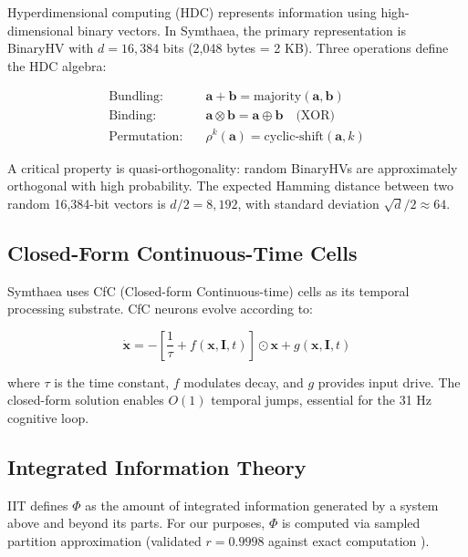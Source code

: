 \documentclass[11pt,a4paper]{article}
\begin{document}
Hyperdimensional computing (HDC) \citep{kanerva2009} represents information using high-dimensional binary vectors. In Symthaea, the primary representation is BinaryHV with $d = 16{,}384$ bits (2,048 bytes = 2 KB). Three operations define the HDC algebra:

\begin{align}
\text{Bundling:} \quad & \mathbf{a} + \mathbf{b} = \text{majority}(\mathbf{a}, \mathbf{b}) \\
\text{Binding:} \quad & \mathbf{a} \otimes \mathbf{b} = \mathbf{a} \oplus \mathbf{b} \quad \text{(XOR)} \\
\text{Permutation:} \quad & \rho^k(\mathbf{a}) = \text{cyclic-shift}(\mathbf{a}, k)
\end{align}

A critical property is quasi-orthogonality: random BinaryHVs are approximately orthogonal with high probability. The expected Hamming distance between two random 16,384-bit vectors is $d/2 = 8{,}192$, with standard deviation $\sqrt{d}/2 \approx 64$.

\subsection{Closed-Form Continuous-Time Cells}

Symthaea uses CfC (Closed-form Continuous-time) cells \citep{hasani2021} as its temporal processing substrate. CfC neurons evolve according to:

\begin{equation}
\dot{\mathbf{x}} = -\left[\frac{1}{\tau} + f(\mathbf{x}, \mathbf{I}, t)\right] \odot \mathbf{x} + g(\mathbf{x}, \mathbf{I}, t)
\end{equation}

where $\tau$ is the time constant, $f$ modulates decay, and $g$ provides input drive. The closed-form solution enables $O(1)$ temporal jumps, essential for the 31 Hz cognitive loop.

\subsection{Integrated Information Theory}

IIT \citep{tononi2004,oizumi2014} defines $\Phi$ as the amount of integrated information generated by a system above and beyond its parts. For our purposes, $\Phi$ is computed via sampled partition approximation (validated $r = 0.9998$ against exact computation \citep{stoltz2026phi}).
\end{document}
